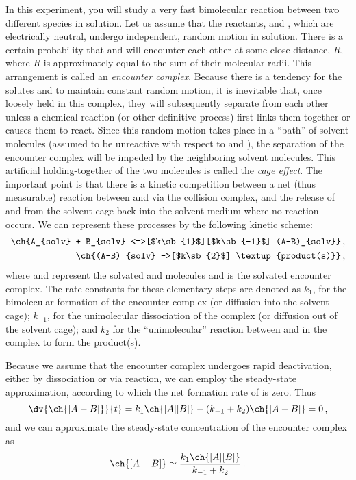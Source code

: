 In this experiment, you will study a very fast bimolecular reaction between two different species in solution. 
Let us assume that the reactants,  and , which are electrically neutral, undergo independent, random motion in solution. 
There is a certain probability that  and  will encounter each other at some close distance, \(R\), where \(R\) is approximately equal to the sum of their molecular radii. 
This arrangement is called an \emph{encounter complex}. 
Because there is a tendency for the solutes  and  to maintain constant random motion, it is inevitable that, once
loosely held in this complex, they will subsequently separate from each other unless a chemical
reaction (or other definitive process) first links them together or causes them to react. 
Since this random motion takes place in a ``bath'' of solvent molecules (assumed to be unreactive with respect
to  and ), the separation of the  encounter complex will be impeded by the neighboring
solvent molecules. 
This artificial holding-together of the two molecules is called the \emph{cage effect}.
The important point is that there is a kinetic competition between a net (thus measurable) reaction
between  and  via the collision complex, and the release of  and  from the solvent cage back
into the solvent medium where no reaction occurs. 
We can represent these processes by the following kinetic scheme:
\begin{align}
\begin{split}
	\ch{A_{solv} + B_{solv} <=>[$k\sb{1}$][$k\sb{-1}$] (A-B)_{solv}} \, , \\
	\ch{(A-B)_{solv} ->[$k\sb{2}$] \textup{product(s)}} \, ,
\end{split}
\label{eq:rxn_scheme}
\end{align}
where  and  represent the solvated  and  molecules and  is the solvated encounter complex. 
The rate constants for these elementary steps are denoted as \( k_1 \), for the bimolecular formation of the encounter complex (or diffusion into the solvent cage); \( k_{-1} \), for the unimolecular dissociation of the complex (or diffusion out of the solvent cage); and \( k_2 \) for the ``unimolecular'' reaction between  and  in the complex to form the product(s). 

Because we assume that the encounter complex undergoes rapid deactivation, either by
dissociation or via reaction, we can employ the steady-state approximation, according to which
the net formation rate of  is zero. Thus
\[
	\dv{\ch{[A-B]}}{t} = k_1 \ch{[A][B]} - (k_{-1} + k_2)\ch{[A-B]} = 0 \, ,
\]
and we can approximate the steady-state concentration of the encounter complex as 
\[
	\ch{[A-B]} \simeq \frac{k_1\ch{[A][B]}}{k_{-1}+k_2} \, .
\]

